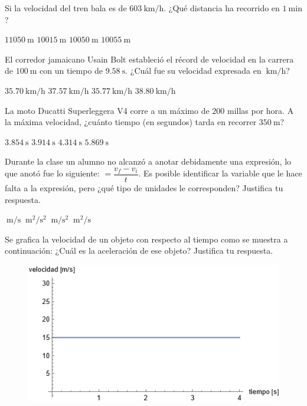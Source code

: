 \documentclass[14pt]{exam}
\begin{document}
\begin{questions}
    \question Si la velocidad del tren bala es de $\SI{603}{\kilo\meter\per\hour}$. ¿Qué distancia ha recorrido en $\SI{1}{\minute}$?
    \\[0.5em]
    \begin{oneparchoices}
        \choice $\SI{11050}{\meter}$
        \choice $\SI{10015}{\meter}$
        \choice $\SI{10050}{\meter}$
        \choice $\SI{10055}{\meter}$
    \end{oneparchoices}
    \question El corredor jamaicano Usain Bolt estableció el récord de velocidad en la carrera de $\SI{100}{\meter}$ con un tiempo de $\SI{9.58}{\second}$. ¿Cuál fue su velocidad expresada en $\SI{}{\kilo\meter\per\hour}$?    \\[0.5em]
    \begin{oneparchoices}
        \choice $\SI{35.70}{\kilo\meter\per\hour}$
        \choice $\SI{37.57}{\kilo\meter\per\hour}$
        \choice $\SI{35.77}{\kilo\meter\per\hour}$
        \choice $\SI{38.80}{\kilo\meter\per\hour}$
    \end{oneparchoices}
    \question La moto Ducatti Superleggera V4 corre a un máximo de $200$ millas por hora. A la máxima velocidad, ¿cuánto tiempo (en segundos) tarda en recorrer $\SI{350}{\meter}$?
    \\[0.5em]
    \begin{oneparchoices}
        \choice $\SI{3.854}{\second}$
        \choice $\SI{3.914}{\second}$
        \choice $\SI{4.314}{\second}$
        \choice $\SI{5.869}{\second}$
    \end{oneparchoices}
    \question Durante la clase un alumno no alcanzó a anotar debidamente una expresión, lo que anotó fue lo siguiente: $= \dfrac{v_{f} - v_{i}}{t}$. Es posible identificar la variable que le hace falta a la expresión, pero ¿qué tipo de unidades le corresponden? Justifica tu respuesta.
    \\[0.5em]
    \begin{oneparchoices}
        \choice $\SI{}{\meter\per\second}$
        \choice $\SI{}{\square\meter\per\square\second}$
        \choice $\SI{}{\meter\per\square\second}$
        \choice $\SI{}{\square\meter\per\second}$
    \end{oneparchoices}
    \newpage
    \question Se grafica la velocidad de un objeto con respecto al tiempo como se muestra a continuación: ¿Cuál es la aceleración de ese objeto? Justifica tu respuesta.
    \begin{figure}[H]
        \centering
        \includegraphics[scale=0.7]{Imagenes/Examen_Repaso_2023_03_07_05.png}

\end{figure}
\end{questions}
\end{document}
